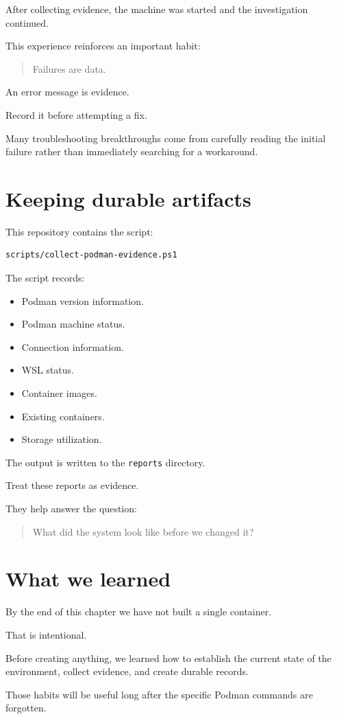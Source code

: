 After collecting evidence, the machine was started and the investigation continued.

This experience reinforces an important habit:

\begin{quote}
Failures are data.
\end{quote}

An error message is evidence.

Record it before attempting a fix.

Many troubleshooting breakthroughs come from carefully reading the initial failure rather than immediately searching for a workaround.

\section{Keeping durable artifacts}

This repository contains the script:

\begin{lstlisting}[language=bash]
scripts/collect-podman-evidence.ps1
\end{lstlisting}

The script records:

\begin{itemize}
  \item Podman version information.
  \item Podman machine status.
  \item Connection information.
  \item WSL status.
  \item Container images.
  \item Existing containers.
  \item Storage utilization.
\end{itemize}

The output is written to the \texttt{reports} directory.

Treat these reports as evidence.

They help answer the question:

\begin{quote}
What did the system look like before we changed it?
\end{quote}

\section{What we learned}

By the end of this chapter we have not built a single container.

That is intentional.

Before creating anything, we learned how to establish the current state of the environment, collect evidence, and create durable records.

Those habits will be useful long after the specific Podman commands are forgotten.

